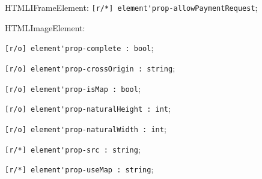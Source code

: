 \begin{icItems}
	\item HTMLIFrameElement: \lstinline|[r/*] element'prop-allowPaymentRequest|;
	
	\item HTMLImageElement:
	\begin{icItems}
		\item \lstinline|[r/o] element'prop-complete : bool|;
		\item \lstinline|[r/o] element'prop-crossOrigin : string|;
		\item \lstinline|[r/o] element'prop-isMap : bool|;
		\item \lstinline|[r/o] element'prop-naturalHeight : int|;
		\item \lstinline|[r/o] element'prop-naturalWidth : int|;
		\item \lstinline|[r/*] element'prop-src : string|;
		\item \lstinline|[r/*] element'prop-useMap : string|;
	\end{icItems}
	

\end{icItems}

